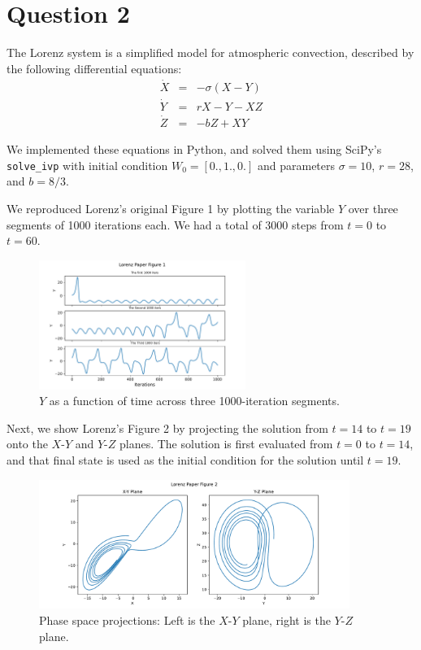 \documentclass{article}
\begin{document}
\section*{Question 2}

The Lorenz system is a simplified model for atmospheric convection, described by the following differential equations:
\begin{eqnarray}
\dot X &=& -\sigma(X-Y)\\
\dot Y &=& rX -Y - XZ\\
\dot Z &=& -bZ + XY
\end{eqnarray}

We implemented these equations in Python, and solved them using SciPy's \texttt{solve\_ivp} 
with initial condition \( W_0 = [0., 1., 0.] \) and parameters \( \sigma = 10 \), \( r = 28 \), and \( b = 8/3 \).

We reproduced Lorenz's original Figure 1 by plotting the variable \( Y \) over three segments of 1000 iterations each.
We had a total of 3000 steps from \( t = 0 \) to \( t = 60 \).

\begin{figure}[H]
    \centering
    \includegraphics[width=0.6\textwidth]{question2fig1.pdf}
    \caption{\( Y \) as a function of time across three 1000-iteration segments.}
    \label{fig:q2_y_segments}
\end{figure}

Next, we show Lorenz's Figure 2 by projecting the solution from 
\( t = 14 \) to \( t = 19 \) onto the \( X\text{-}Y \) and \( Y\text{-}Z \) planes.
The solution is first evaluated from \( t = 0\) to \( t = 14 \), and that final state is used as the initial condition for the solution until \( t = 19 \). 

\begin{figure}[H]
    \centering
    \includegraphics[width=0.9\textwidth]{question2fig2.pdf}
    \caption{Phase space projections: Left is the \( X\text{-}Y \) plane, right is the \( Y\text{-}Z \) plane.}
    \label{fig:q2_phase}
\end{figure}
\end{document}
